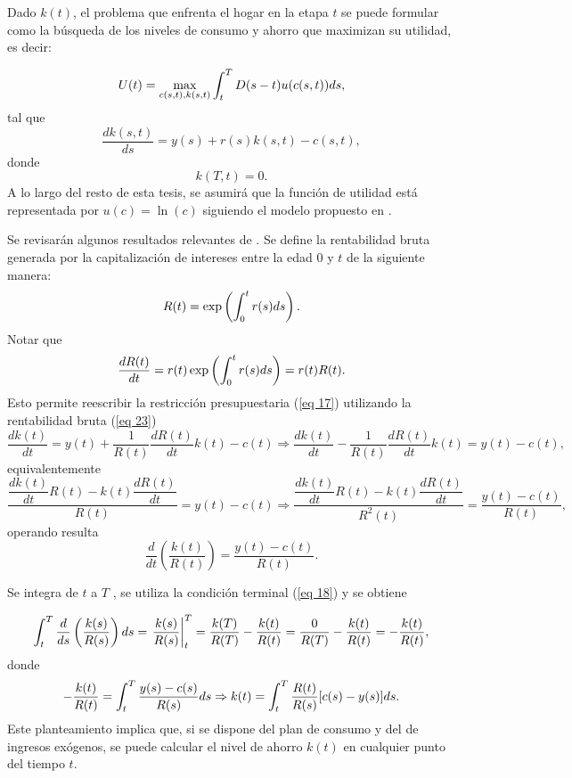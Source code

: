 Dado $k(t)$, el problema que enfrenta el hogar en la etapa $t$ se puede formular como la búsqueda de los niveles de consumo y ahorro que maximizan su utilidad, es decir:

\begin{equation}
\label{eq 19}
    U(t)= \max_{c(s,t), k(s,t)} \displaystyle \int_{t}^{T} D(s-t)u(c(s,t)) ds,
\end{equation}
\noindent tal que
\begin{equation}
\label{eq 20}
    \dfrac{dk(s,t)}{ds}=y(s) + r(s) k(s,t) - c(s,t),
\end{equation}
donde
\begin{equation}
\label{eq 21}
    k(T,t)=0.
\end{equation}
\noindent A lo largo del resto de esta tesis, se asumirá que la función de utilidad está representada por $u(c) = \ln(c)$ siguiendo el modelo propuesto en \parencite{feigenbaum2021deviation}. 

Se revisarán algunos resultados relevantes de \parencite{Feigenbaum16}. Se define la rentabilidad bruta generada por la capitalización de intereses entre la edad $0$ y $t$ de la siguiente manera:
\begin{equation}
\label{eq 22}
    R(t)=\exp \left(\displaystyle \int_{0}^t r(s)ds\right).
\end{equation}
Notar que
\begin{equation}
\label{eq 23}
    \dfrac{dR(t)}{dt}= r(t) \exp \left(\displaystyle \int_{0}^t r(s)ds\right) = r(t) R(t).
\end{equation}
Esto permite reescribir la restricción presupuestaria (\ref{eq 17}) utilizando la rentabilidad bruta (\ref{eq 23})
$$\dfrac{dk(t)}{dt}= y(t)+\dfrac{1}{R(t)}\dfrac{dR(t)}{dt} k(t)-c(t) \Rightarrow 
\dfrac{dk(t)}{dt}-\dfrac{1}{R(t)}\dfrac{dR(t)}{dt} k(t)= y(t)-c(t),$$
equivalentemente
$$\dfrac{\dfrac{dk(t)}{dt} R(t)- k(t)\dfrac{dR(t)}{dt}}{R(t)}= y(t)-c(t)\Rightarrow
\dfrac{\dfrac{dk(t)}{dt} R(t)- k(t)\dfrac{dR(t)}{dt}}{R^2(t)}= \dfrac{y(t)-c(t)}{R(t)},$$
operando resulta
\begin{equation}
\label{eq 24}
    \dfrac{d}{dt} \left( \dfrac{k(t)}{R(t)}\right)= \dfrac{y(t) - c(t)}{R(t)}.
\end{equation}

\noindent Se integra de $t$ a $T$ , se utiliza la condición terminal (\ref{eq 18}) y se obtiene

$$\displaystyle \int_t^T \dfrac{d}{ds} \left( \dfrac{k(s)}{R(s)}\right)ds= \left.\dfrac{k(s)}{R(s)} \right|_t^T = \dfrac{k(T)}{R(T)} - \dfrac{k(t)}{R(t)} = \dfrac{0}{R(T)} - \dfrac{k(t)}{R(t)}=- \dfrac{k(t)}{R(t)}, $$
donde
%
\begin{equation}
\label{eq 25}
   \displaystyle - \dfrac{k(t)}{R(t)}= \int_ t^T \dfrac{y(s) - c(s)}{R(s)} ds \Rightarrow
   \displaystyle k(t) = \displaystyle \int_t^T \dfrac{R(t)}{R(s)} [c(s)-y(s)]ds.
\end{equation}
Este planteamiento implica que, si se dispone del plan de consumo y del de ingresos exógenos, se puede calcular el nivel de ahorro $k(t)$ en cualquier punto del tiempo $t$. 

